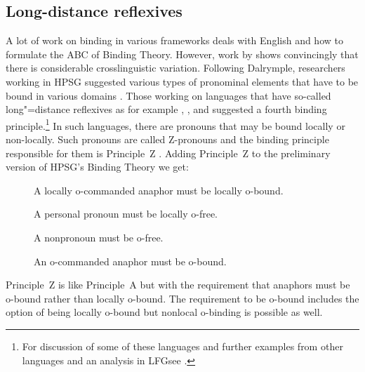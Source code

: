 \documentclass[output=paper
 	        ,biblatex
                ,babelshorthands
                ,newtxmath
                ,draftmode
                ,colorlinks, citecolor=brown
]{langscibook}
\begin{document}
\subsection{Long-distance reflexives}

A lot of work on binding in various frameworks deals with English and how to formulate the ABC of
Binding Theory. However, work by \citet{Dalrymple93a} shows convincingly that there is considerable
crosslinguistic variation. Following Dalrymple, researchers working in HPSG suggested various types of pronominal
elements that have to be bound in various domains \citep{AGS1998a,Koenig1999b,XPS94a-u,PX98a,BM99a,Dalrymple93a,Hellan2005a}.
Those working on languages that have so-called long"=distance
reflexives\label{page-long-distance-reflexives} as for example ,
, and 
\citep*{XPS94a-u,PX98a,BM99a,Dalrymple93a,Hellan2005a} suggested a fourth binding principle.\footnote{
For discussion of some of these languages and further examples from other languages and an analysis
in LFG\indexlfg see .
} In such languages, there are pronouns that may be bound locally or
non-locally. Such pronouns are called Z-pronouns and the binding principle responsible for them is
Principle~Z \citep[]{BM99a}. Adding Principle~Z to the preliminary version of HPSG's
Binding Theory we get:
\begin{principle-break}
\begin{description}
\item [] A locally o-commanded anaphor must be locally o-bound.
\item [] A personal pronoun must be locally o-free.
\item [] A nonpronoun must be o-free.
\item [] An o-commanded anaphor must be o-bound.
\end{description}
\end{principle-break}
Principle~Z is like Principle~A but with the requirement that anaphors must be o-bound rather than
locally o-bound. The requirement to be o-bound includes the option of being locally o-bound but
nonlocal o-binding is possible as well. 
\end{document}
